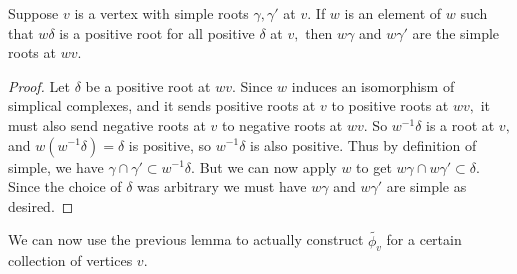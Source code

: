 \documentclass[class=book, crop=false,12 pt]{standalone}
\begin{document}
\begin{lemma}
	Suppose $v$ is a vertex with simple roots $\gamma,\gamma'$ at $v.$ If $w$ is an element of $w$ such that $w\delta$ is a positive root for all positive $\delta$ at $v,$ then $w\gamma$ and $w\gamma'$ are the simple roots at $wv.$ \label{preservesimple}
\end{lemma}
\begin{proof}
	Let $\delta$ be a positive root at $wv.$ Since $w$ induces an isomorphism of simplical complexes, and it sends positive roots at $v$ to positive roots at $wv,$ it must also send negative roots at $v$ to negative roots at $wv.$ So $w^{-1}\delta$ is a root at $v,$ and $w(w^{-1}\delta)=\delta$ is positive, so $w^{-1}\delta$ is also positive. Thus by definition of simple, we have $\gamma \cap \gamma'\subset w^{-1}\delta.$ But we can now apply $w$ to get $w\gamma \cap w\gamma' \subset \delta.$ Since the choice of $\delta$ was arbitrary we must have $w\gamma$ and $w\gamma'$ are simple as desired.
\end{proof}

We can now use the previous lemma to actually construct $\tilde{\phi_v}$ for a certain collection of vertices $v.$
\end{document}

